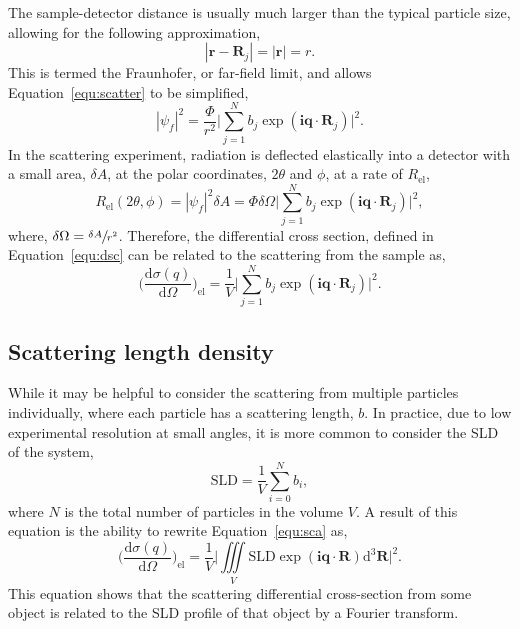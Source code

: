 The sample-detector distance is usually much larger than the typical particle size, allowing for the following approximation,
%
\begin{equation}
    |\mathbf{r} - \mathbf{R}_j| = |\mathbf{r}| = r.
\end{equation}
%
This is termed the Fraunhofer, or far-field limit, and allows Equation~\ref{equ:scatter} to be simplified,
%
\begin{equation}
    |\psi_f|^2 = \frac{\Phi}{r^2}\Bigg|\sum_{j=1}^{N}b_j\exp{(\mathbf{iq}\cdot\mathbf{R}_j)}\Bigg|^2.
\end{equation}
%
In the scattering experiment, radiation is deflected elastically into a detector with a small area, $\delta A$, at the polar coordinates, $2\theta$ and $\phi$, at a rate of $R_{\text{el}}$,
%
\begin{equation}
    R_{\text{el}}(2\theta,\phi) = |\psi_f|^2\delta A = \Phi\delta\Omega\Bigg|\sum_{j=1}^{N}b_j\exp{(\mathbf{iq}\cdot\mathbf{R}_j)}\Bigg|^2,
\end{equation}
%
where, $\delta\Omega = \sfrac{\delta A}{r^2}$.
Therefore, the differential cross section, defined in Equation~\ref{equ:dsc} can be related to the scattering from the sample as,
%
\begin{equation}
    \bigg(\frac{\text{d}\sigma(q)}{\text{d}\Omega}\bigg)_{\text{el}} = \frac{1}{V} \Bigg|\sum_{j=1}^{N}b_j\exp{(\mathbf{iq}\cdot\mathbf{R}_j)}\Bigg|^2.
    \label{equ:sca}
\end{equation}
%

\subsection{Scattering length density}
\label{sec:sld}
While it may be helpful to consider the scattering from multiple particles individually, where each particle has a scattering length, $b$.
In practice, due to low experimental resolution at small angles, it is more common to consider the SLD of the system,
%
\begin{equation}
    \text{SLD} = \frac{1}{V}\sum_{i=0}^{N} b_i,
\end{equation}
%
where $N$ is the total number of particles in the volume $V$.
A result of this equation is the ability to rewrite Equation~\ref{equ:sca} as,
%
\begin{equation}
    \bigg(\frac{\text{d}\sigma(q)}{\text{d}\Omega}\bigg)_{\text{el}} = \frac{1}{V} \Bigg|\iiint \limits_V \text{SLD}\exp{(\mathbf{iq}\cdot\mathbf{R})}\text{d}^3\mathbf{R}\Bigg|^2.
    \label{equ:sldsca}
\end{equation}
%
This equation shows that the scattering differential cross-section from some object is related to the SLD profile of that object by a Fourier transform.

